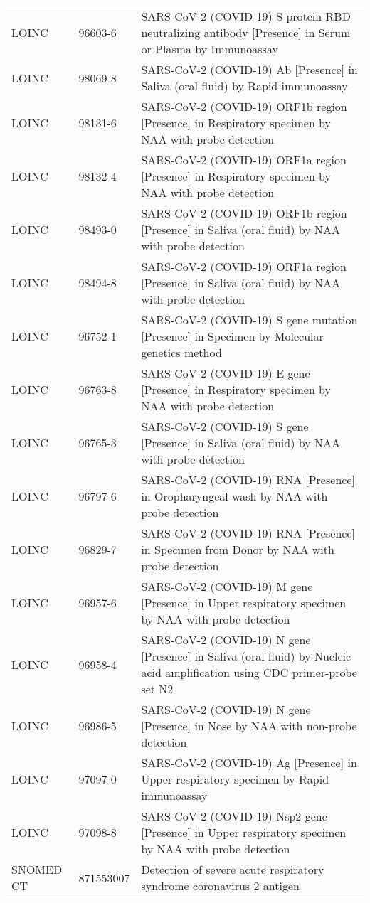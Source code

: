 \begin{table}[ht]
\begin{tabular}{lll}
  LOINC & 96603-6 & SARS-CoV-2 (COVID-19) S protein RBD neutralizing antibody [Presence] in Serum or Plasma by Immunoassay \\ 
  LOINC & 98069-8 & SARS-CoV-2 (COVID-19) Ab [Presence] in Saliva (oral fluid) by Rapid immunoassay \\ 
  LOINC & 98131-6 & SARS-CoV-2 (COVID-19) ORF1b region [Presence] in Respiratory specimen by NAA with probe detection \\ 
  LOINC & 98132-4 & SARS-CoV-2 (COVID-19) ORF1a region [Presence] in Respiratory specimen by NAA with probe detection \\ 
  LOINC & 98493-0 & SARS-CoV-2 (COVID-19) ORF1b region [Presence] in Saliva (oral fluid) by NAA with probe detection \\ 
  LOINC & 98494-8 & SARS-CoV-2 (COVID-19) ORF1a region [Presence] in Saliva (oral fluid) by NAA with probe detection \\ 
  LOINC & 96752-1 & SARS-CoV-2 (COVID-19) S gene mutation [Presence] in Specimen by Molecular genetics method \\ 
  LOINC & 96763-8 & SARS-CoV-2 (COVID-19) E gene [Presence] in Respiratory specimen by NAA with probe detection \\ 
  LOINC & 96765-3 & SARS-CoV-2 (COVID-19) S gene [Presence] in Saliva (oral fluid) by NAA with probe detection \\ 
  LOINC & 96797-6 & SARS-CoV-2 (COVID-19) RNA [Presence] in Oropharyngeal wash by NAA with probe detection \\ 
  LOINC & 96829-7 & SARS-CoV-2 (COVID-19) RNA [Presence] in Specimen from Donor by NAA with probe detection \\ 
  LOINC & 96957-6 & SARS-CoV-2 (COVID-19) M gene [Presence] in Upper respiratory specimen by NAA with probe detection \\ 
  LOINC & 96958-4 & SARS-CoV-2 (COVID-19) N gene [Presence] in Saliva (oral fluid) by Nucleic acid amplification using CDC primer-probe set N2 \\ 
  LOINC & 96986-5 & SARS-CoV-2 (COVID-19) N gene [Presence] in Nose by NAA with non-probe detection \\ 
  LOINC & 97097-0 & SARS-CoV-2 (COVID-19) Ag [Presence] in Upper respiratory specimen by Rapid immunoassay \\ 
  LOINC & 97098-8 & SARS-CoV-2 (COVID-19) Nsp2 gene [Presence] in Upper respiratory specimen by NAA with probe detection \\ 
  SNOMED CT & 871553007 & Detection of severe acute respiratory syndrome coronavirus 2 antigen \\ 

\end{tabular}
\end{table}
